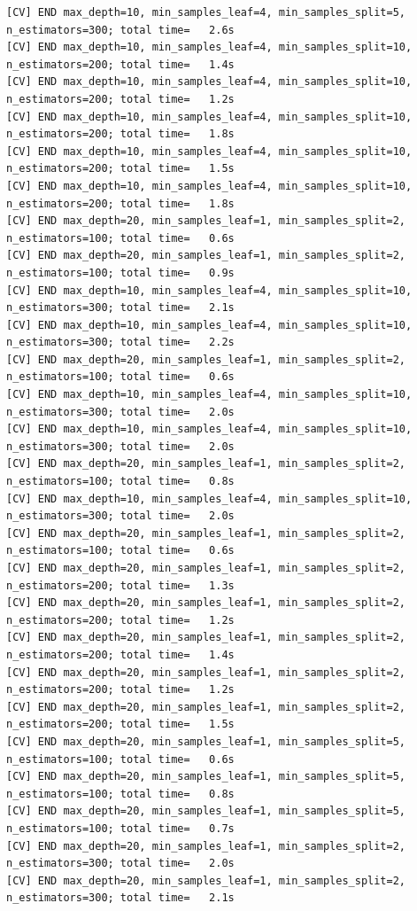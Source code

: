 \documentclass[
  11pt,
  letterpaper,
  DIV=11,
  numbers=noendperiod]{scrartcl}
\begin{document}
\begin{verbatim}
[CV] END max_depth=10, min_samples_leaf=4, min_samples_split=5, n_estimators=300; total time=   2.6s
[CV] END max_depth=10, min_samples_leaf=4, min_samples_split=10, n_estimators=200; total time=   1.4s
[CV] END max_depth=10, min_samples_leaf=4, min_samples_split=10, n_estimators=200; total time=   1.2s
[CV] END max_depth=10, min_samples_leaf=4, min_samples_split=10, n_estimators=200; total time=   1.8s
[CV] END max_depth=10, min_samples_leaf=4, min_samples_split=10, n_estimators=200; total time=   1.5s
[CV] END max_depth=10, min_samples_leaf=4, min_samples_split=10, n_estimators=200; total time=   1.8s
[CV] END max_depth=20, min_samples_leaf=1, min_samples_split=2, n_estimators=100; total time=   0.6s
[CV] END max_depth=20, min_samples_leaf=1, min_samples_split=2, n_estimators=100; total time=   0.9s
[CV] END max_depth=10, min_samples_leaf=4, min_samples_split=10, n_estimators=300; total time=   2.1s
[CV] END max_depth=10, min_samples_leaf=4, min_samples_split=10, n_estimators=300; total time=   2.2s
[CV] END max_depth=20, min_samples_leaf=1, min_samples_split=2, n_estimators=100; total time=   0.6s
[CV] END max_depth=10, min_samples_leaf=4, min_samples_split=10, n_estimators=300; total time=   2.0s
[CV] END max_depth=10, min_samples_leaf=4, min_samples_split=10, n_estimators=300; total time=   2.0s
[CV] END max_depth=20, min_samples_leaf=1, min_samples_split=2, n_estimators=100; total time=   0.8s
[CV] END max_depth=10, min_samples_leaf=4, min_samples_split=10, n_estimators=300; total time=   2.0s
[CV] END max_depth=20, min_samples_leaf=1, min_samples_split=2, n_estimators=100; total time=   0.6s
[CV] END max_depth=20, min_samples_leaf=1, min_samples_split=2, n_estimators=200; total time=   1.3s
[CV] END max_depth=20, min_samples_leaf=1, min_samples_split=2, n_estimators=200; total time=   1.2s
[CV] END max_depth=20, min_samples_leaf=1, min_samples_split=2, n_estimators=200; total time=   1.4s
[CV] END max_depth=20, min_samples_leaf=1, min_samples_split=2, n_estimators=200; total time=   1.2s
[CV] END max_depth=20, min_samples_leaf=1, min_samples_split=2, n_estimators=200; total time=   1.5s
[CV] END max_depth=20, min_samples_leaf=1, min_samples_split=5, n_estimators=100; total time=   0.6s
[CV] END max_depth=20, min_samples_leaf=1, min_samples_split=5, n_estimators=100; total time=   0.8s
[CV] END max_depth=20, min_samples_leaf=1, min_samples_split=5, n_estimators=100; total time=   0.7s
[CV] END max_depth=20, min_samples_leaf=1, min_samples_split=2, n_estimators=300; total time=   2.0s
[CV] END max_depth=20, min_samples_leaf=1, min_samples_split=2, n_estimators=300; total time=   2.1s

\end{verbatim}
\end{document}
